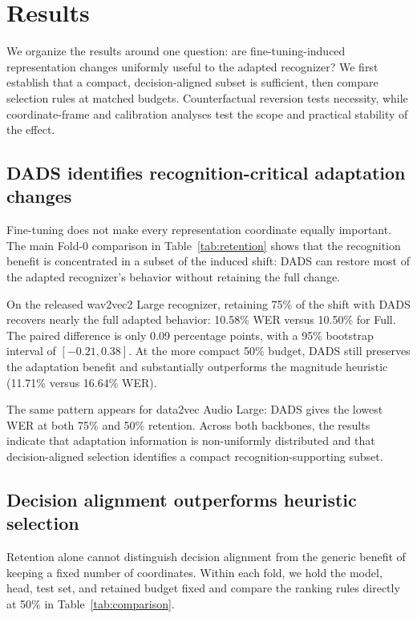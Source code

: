 \documentclass{article}
\begin{document}
\section{Results}
\label{sec:results}
We organize the results around one question: are fine-tuning-induced
representation changes uniformly useful to the adapted recognizer? We first
establish that a compact, decision-aligned subset is sufficient, then compare
selection rules at matched budgets. Counterfactual reversion tests necessity,
while coordinate-frame and calibration analyses test the scope and practical
stability of the effect.

\subsection{DADS identifies recognition-critical adaptation changes}
\label{sec:retention}
Fine-tuning does not make every representation coordinate equally important.
The main Fold-0 comparison in Table~\ref{tab:retention} shows that the
recognition benefit is concentrated in a subset of the induced shift: DADS can
restore most of the adapted recognizer's behavior without retaining the full
change.

\begin{table}[t]
\centering
\small
\setlength{\tabcolsep}{3pt}
\renewcommand{\arraystretch}{1.04}
\caption{Main Fold-0 results. Test WER (\%) is shown for wav2vec2 Large and
data2vec Audio Large. Bold highlights the DADS results at each
retained-shift budget.}
\label{tab:retention}

\end{table}

On the released wav2vec2 Large recognizer, retaining 75\% of the shift with DADS
recovers nearly the full adapted behavior: 10.58\% WER versus 10.50\% for
Full. The paired difference is only 0.09 percentage points, with a 95\%
bootstrap interval of $[-0.21,0.38]$. At the more compact 50\% budget, DADS
still preserves the adaptation benefit and substantially outperforms the
magnitude heuristic (11.71\% versus 16.64\% WER).

The same pattern appears for data2vec Audio Large: DADS gives the lowest WER
at both 75\% and 50\% retention.
Across both backbones, the results indicate that adaptation information is
non-uniformly distributed and that decision-aligned selection identifies a
compact recognition-supporting subset.

\subsection{Decision alignment outperforms heuristic selection}
\label{sec:comparison}
Retention alone cannot distinguish decision alignment from the generic benefit
of keeping a fixed number of coordinates. Within each fold, we hold the model,
head, test set, and retained budget fixed and compare the ranking rules directly at
50\% in Table~\ref{tab:comparison}.
\end{document}
